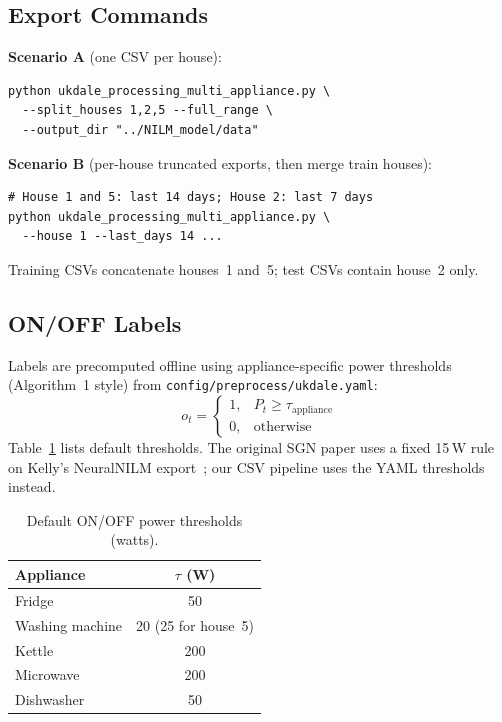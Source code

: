 \documentclass[conference]{IEEEtran}
\begin{document}
\subsection{Export Commands}
\textbf{Scenario A} (one CSV per house):
\begin{verbatim}
python ukdale_processing_multi_appliance.py \
  --split_houses 1,2,5 --full_range \
  --output_dir "../NILM_model/data"
\end{verbatim}

\textbf{Scenario B} (per-house truncated exports, then merge train houses):
\begin{verbatim}
# House 1 and 5: last 14 days; House 2: last 7 days
python ukdale_processing_multi_appliance.py \
  --house 1 --last_days 14 ...
\end{verbatim}

Training CSVs concatenate houses~1 and~5; test CSVs contain house~2 only.

\subsection{ON/OFF Labels}
Labels are precomputed offline using appliance-specific power thresholds (Algorithm~1 style) from \texttt{config/preprocess/ukdale.yaml}:
\begin{equation}
o_t =
\begin{cases}
1, & P_t \geq \tau_{\mathrm{appliance}} \\
0, & \text{otherwise}
\end{cases}
\label{eq:onoff}
\end{equation}
Table~\ref{tab:thresholds} lists default thresholds.
The original SGN paper uses a fixed 15\,W rule on Kelly's NeuralNILM export~\cite{kelly2015neuralnilm}; our CSV pipeline uses the YAML thresholds instead.

\begin{table}[htbp]
\caption{Default ON/OFF power thresholds (watts).}
\label{tab:thresholds}
\centering
\begin{tabular}{@{}lc@{}}
\toprule
\textbf{Appliance} & $\tau$ (W) \\
\midrule
Fridge & 50 \\
Washing machine & 20 (25 for house~5) \\
Kettle & 200 \\
Microwave & 200 \\
Dishwasher & 50 \\
\bottomrule
\end{tabular}
\end{table}
\end{document}
